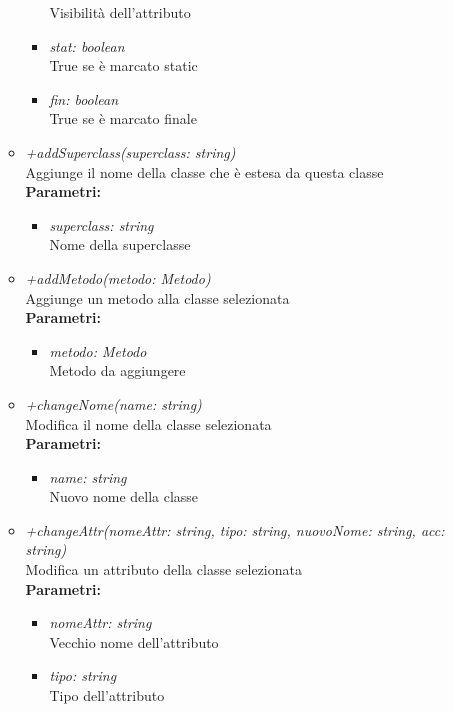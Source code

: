 \begin{itemize}
\begin{itemize}
\begin{itemize}
    			Visibilità dell'attributo
    			\item \emph{stat: boolean}\\
    			True se è marcato static
    			\item \emph{fin: boolean}\\
    			True se è marcato finale
    		\end{itemize}
    		\item \emph{+addSuperclass(superclass: string)}\\
    		Aggiunge il nome della classe che è estesa da questa classe\\
    		\textbf{Parametri:}
    		\begin{itemize}
    			\item \emph{superclass: string}\\
    			Nome della superclasse
    		\end{itemize}
    		\item \emph{+addMetodo(metodo: Metodo) }\\
    		Aggiunge un metodo alla classe selezionata\\
    		\textbf{Parametri:}
    		\begin{itemize}
    			\item \emph{metodo: Metodo}\\
    			Metodo da aggiungere
    		\end{itemize}
    		\item \emph{+changeNome(name: string)}\\
    		Modifica il nome della classe selezionata\\
    		\textbf{Parametri:}
    		\begin{itemize}
    			\item \emph{name: string}\\
    			Nuovo nome della classe
    		\end{itemize}
    		\item \emph{+changeAttr(nomeAttr: string, tipo: string, nuovoNome: string, acc: string)}\\
    		Modifica un attributo della classe selezionata\\
    		\textbf{Parametri:}
    		\begin{itemize}
    			\item \emph{nomeAttr: string}\\
    			Vecchio nome dell'attributo
    			\item \emph{tipo: string}\\
    			Tipo dell'attributo

\end{itemize}
\end{itemize}
\end{itemize}
